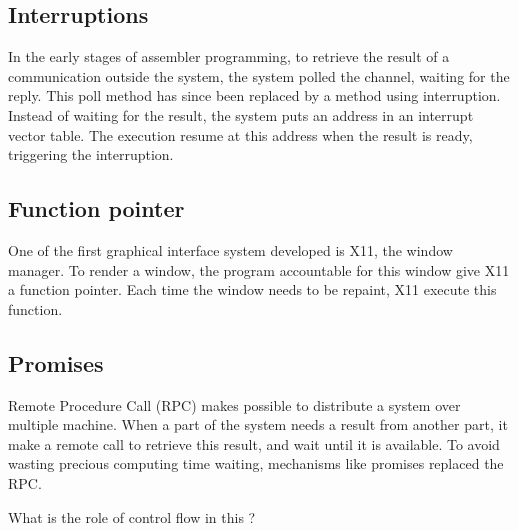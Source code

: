 \subsection{Interruptions}

In the early stages of assembler programming, to retrieve the result of a communication outside the system, the system polled the channel, waiting for the reply.
This poll method has since been replaced by a method using interruption.
Instead of waiting for the result, the system puts an address in an interrupt vector table.
The execution resume at this address when the result is ready, triggering the interruption.

\subsection{Function pointer}

One of the first graphical interface system developed is X11, the window manager.
To render a window, the program accountable for this window give X11 a function pointer.
Each time the window needs to be repaint, X11 execute this function.

\subsection{Promises}

Remote Procedure Call (RPC) makes possible to distribute a system over multiple machine.
When a part of the system needs a result from another part, it make a remote call to retrieve this result, and wait until it is available.
To avoid wasting precious computing time waiting, mechanisms like promises replaced the RPC.


What is the role of control flow in this ?